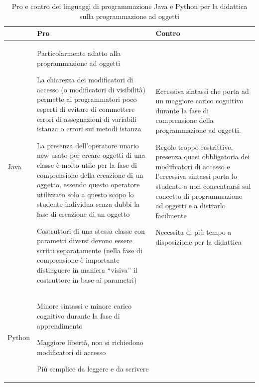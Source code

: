 \documentclass[12pt,a4paper]{article}
\newcommand*{\mcl}[1]{\multicolumn{1}{l|}{#1}}
\begin{document}
\begin{table}[H]
    \caption{Pro e contro dei linguaggi di programmazione Java e Python per la didattica sulla programmazione ad oggetti}
    \label{5.1}
    \makegapedcells
{}
    \setlength{\tabcolsep}{3pt}
\begin{tabularx}{\linewidth}{|>{\RaggedRight}p{16mm}|*{2}{I |}}
    \hline

    &   \mcl{Pro}    &   \mcl{Contro}        \\
    \hline
Java
    &   \item Particolarmente adatto alla programmazione ad oggetti
        \item La chiarezza dei modificatori di accesso (o modificatori di visibilità) permette ai programmatori poco esperti di evitare di commettere errori di assegnazioni di variabili istanza o errori sui metodi istanza
        \item La presenza dell’operatore unario new usato per creare oggetti di una classe è molto utile per la fase di comprensione della creazione di un oggetto, essendo questo operatore utilizzato solo a questo scopo lo studente individua senza dubbi la fase di creazione di un oggetto
        \item Costruttori di una stessa classe con parametri diversi devono essere scritti separatamente (nella fase di comprensione è importante distinguere in maniera “visiva” il costruttore in base ai parametri)
        &   \item Eccessiva sintassi che porta ad un maggiore carico cognitivo durante la fase di comprensione della programmazione ad oggetti.
            \item Regole troppo restrittive, presenza quasi obbligatoria dei modificatori di accesso  e l’eccessiva sintassi porta lo studente a non concentrarsi sul concetto di programmazione ad oggetti e a distrarlo facilmente
            \item Necessita di più tempo a disposizione per la didattica
            \\
    \hline
Python
    &   \item Minore sintassi e minore carico cognitivo durante la fase di apprendimento 
        \item Maggiore libertà, non si richiedono modificatori di accesso
        \item Più semplice da leggere e da scrivere

\end{tabularx}
\end{table}
\end{document}
